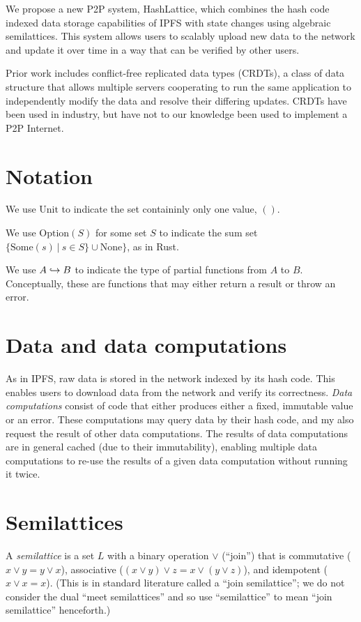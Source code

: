 \documentclass{article}
\begin{document}
    We propose a new P2P system, HashLattice, which combines the hash code indexed data storage capabilities of IPFS with state changes using algebraic semilattices. This system allows users to scalably upload new data to the network and update it over time in a way that can be verified by other users.

    Prior work includes conflict-free replicated data types (CRDTs), a class of data structure that allows multiple servers cooperating to run the same application to independently modify the data and resolve their differing updates. CRDTs have been used in industry, but have not to our knowledge been used to implement a P2P Internet.

  \section{Notation}

    We use $\mathrm{Unit}$ to indicate the set containinly only one value, $()$.

    We use $\mathrm{Option}(S)$ for some set $S$ to indicate the sum set $\{ \mathrm{Some}(s) ~ | ~ s \in S \} \cup \mathrm{None}\}$, as in Rust.


    We use $A \hookrightarrow B$ to indicate the type of partial functions from $A$ to $B$. Conceptually, these are functions that may either return a result or throw an error.

  \section{Data and data computations}

    As in IPFS, raw data is stored in the network indexed by its hash code. This enables users to download data from the network and verify its correctness. \emph{Data computations} consist of code that either produces either a fixed, immutable value or an error. These computations may query data by their hash code, and my also request the result of other data computations. The results of data computations are in general cached (due to their immutability), enabling multiple data computations to re-use the results of a given data computation without running it twice.

  \section{Semilattices}

    A \emph{semilattice} is a set $L$ with a binary operation $\vee$ (``join'') that is commutative ($x \vee y = y \vee x$), associative ($(x \vee y) \vee z = x \vee (y \vee z)$), and idempotent ($x \vee x = x$). (This is in standard literature called a ``join semilattice''; we do not consider the dual ``meet semilattices'' and so use ``semilattice'' to mean ``join semilattice'' henceforth.)
\end{document}
